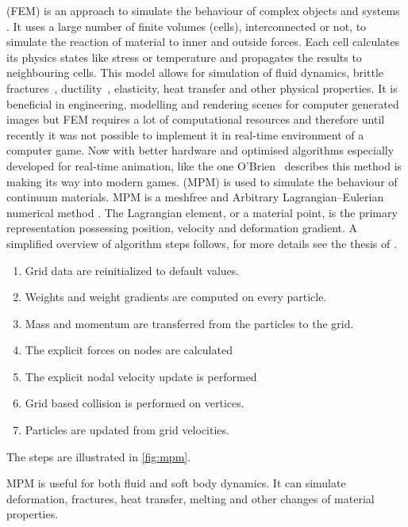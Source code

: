 \label{sec:softBody}
 (FEM) is an approach to simulate the behaviour of complex objects and systems . It uses a large number of finite volumes (cells), interconnected or not, to simulate the reaction of material to inner and outside forces. Each cell calculates its physics states like stress or temperature and propagates the results to neighbouring cells. This model allows for simulation of fluid dynamics, brittle fractures~\cite{brittlefracture}, ductility~\cite{ductilefracture}, elasticity, heat transfer and other physical properties. It is beneficial in engineering, modelling and rendering scenes for computer generated images but FEM requires a lot of computational resources and therefore until recently it was not possible to implement it in real-time environment of a computer game. Now with better hardware and optimised algorithms especially developed for real-time animation, like the one O'Brien~\cite{femingames} describes this method is making its way into modern games.
 (MPM) is used to simulate the behaviour of continuum materials. MPM is a meshfree and Arbitrary Lagrangian–Eulerian numerical method \cite{ALE}. The Lagrangian element, or a material point, is the primary representation possessing position, velocity and deformation gradient. A simplified overview of algorithm steps follows, for more details see the thesis of \citet{jiang2015material}.

\begin{enumerate}
    \item Grid data are reinitialized to default values.
    \item Weights and weight gradients are computed on every particle.
    \item Mass and momentum are transferred from the particles to the grid.
    \item The explicit forces on nodes are calculated
    \item The explicit nodal velocity update is performed
    \item Grid based collision is performed on vertices.
    \item Particles are updated from grid velocities.
\end{enumerate}
The steps are illustrated in \cref{fig:mpm}.

MPM is useful for both fluid and soft body dynamics. It can simulate deformation, fractures, heat transfer, melting and other changes of material properties.

